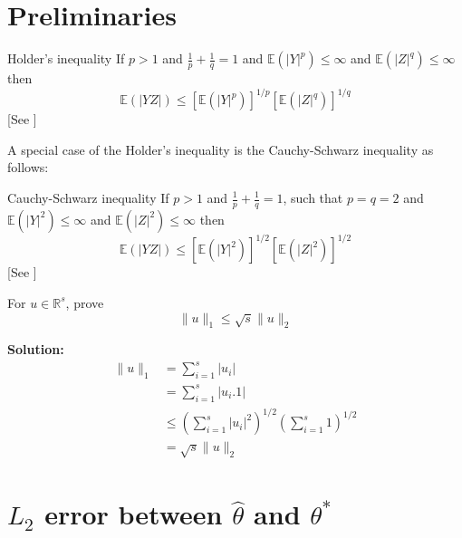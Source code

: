 \documentclass[10pt,handout,english]{beamer}
\newcommand{\E}{\mathbb{E}}
\newcommand{\R}{\mathbb{R}}
\begin{document}
\section{Preliminaries}
\begin{frame}[allowframebreaks]
\begin{block}{Holder's inequality}
If $p>1$ and $\frac{1}{p}+\frac{1}{q}=1$ and $\E\left(\lvert Y\rvert^p\right)\leq\infty$ and $\E\left(\lvert Z\rvert^q\right)\leq\infty$ then
\[
\E\left(\lvert YZ\rvert\right)\leq \left[\E\left(\lvert Y\rvert^p\right)\right]^{1/p}\left[\E\left(\lvert Z\rvert^q\right)\right]^{1/q}
\]
[See \citet{white2014asymptotic}]
\end{block}
A special case of the Holder's inequality is the Cauchy-Schwarz inequality as follows:
\begin{block}{Cauchy-Schwarz inequality}
If $p>1$ and $\frac{1}{p}+\frac{1}{q}=1$, such that $p=q=2$ and $\E\left(\lvert Y\rvert^2\right)\leq\infty$ and $\E\left(\lvert Z\rvert^2\right)\leq\infty$ then
\[
\E\left(\lvert YZ\rvert\right)\leq \left[\E\left(\lvert Y\rvert^2\right)\right]^{1/2}\left[\E\left(\lvert Z\rvert^2\right)\right]^{1/2}
\]
[See \citet{white2014asymptotic}]
\end{block}
\begin{example}
For $u\in\R^s$, prove
\[
\lVert u\rVert_1\leq \sqrt{s}\lVert u\rVert_2
 \]

\noindent\textbf{Solution:}
\begin{align*}
\lVert u\rVert_1&=\sum\limits_{i=1}^s\lvert u_i\rvert\\
&=\sum\limits_{i=1}^s\lvert u_i.1\rvert\\
&\leq\left(\sum\limits_{i=1}^s\lvert u_i\rvert^2\right)^{1/2}\left(\sum\limits_{i=1}^s1\right)^{1/2}\\
&=\sqrt{s}\lVert u\rVert_2
\end{align*}
\end{example}
\end{frame}
\section{$L_2$ error between $\hat{\theta}$ and $\theta^*$}
\end{document}
